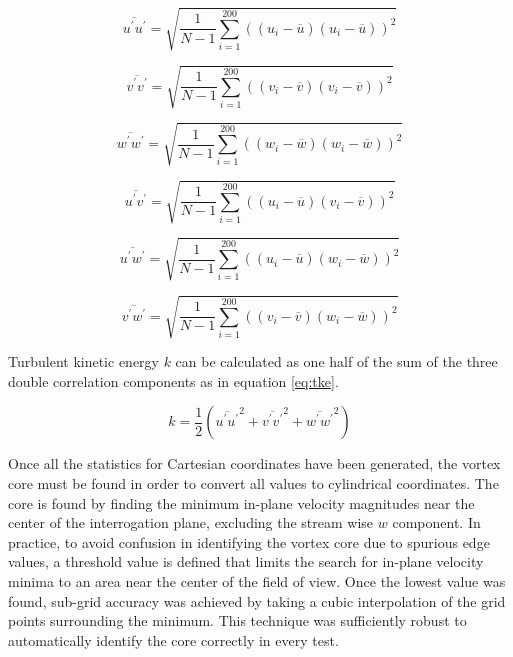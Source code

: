 \begin{equation}
\overline{u^\prime u^\prime} = \sqrt{\frac{1}{N-1} \sum_{i=1}^{200} 
	((u_i - \overline{u})(u_i - \overline{u}))^2}
\label{eq:rs_uu}
\end{equation}

\begin{equation}
\overline{v^\prime v^\prime} = \sqrt{\frac{1}{N-1} \sum_{i=1}^{200} 
	((v_i - \overline{v})(v_i - \overline{v}))^2}
\end{equation}

\begin{equation}
\overline{w^\prime w^\prime} = \sqrt{\frac{1}{N-1} \sum_{i=1}^{200} 
	((w_i - \overline{w})(w_i - \overline{w}))^2}
\end{equation}

\begin{equation}
\overline{u^\prime v^\prime} = \sqrt{\frac{1}{N-1} \sum_{i=1}^{200} 
	((u_i - \overline{u})(v_i - \overline{v}))^2}
\end{equation}

\begin{equation}
\overline{u^\prime w^\prime} = \sqrt{\frac{1}{N-1} \sum_{i=1}^{200} 
	((u_i - \overline{u})(w_i - \overline{w}))^2}
\end{equation}

\begin{equation}
\overline{v^\prime w^\prime} = \sqrt{\frac{1}{N-1} \sum_{i=1}^{200} 
	((v_i - \overline{v})(w_i - \overline{w}))^2}
\label{eq:rs_vw}
\end{equation}

Turbulent kinetic energy $k$ can be calculated as one half 
of the sum of the three double correlation components as in equation 
\ref{eq:tke}.

\begin{equation}
k = \frac{1}{2} \left(\overline{u^\prime u^\prime}^2 + 
	\overline{v^\prime v^\prime}^2 + 
	\overline{w^\prime w^\prime}^2\right)
\label{eq:tke}
\end{equation}


Once all the statistics for Cartesian coordinates have been generated, the 
vortex core must be found in order to convert all values to cylindrical 
coordinates. The core is found by finding the minimum in-plane velocity 
magnitudes near the center of the interrogation plane, excluding the stream 
wise $w$ component. In practice, to avoid confusion in identifying the vortex 
core due to spurious edge values, a threshold value is defined that limits the 
search for in-plane velocity minima to an area near the center of the field of 
view. Once the lowest value was found, sub-grid accuracy was 
achieved by taking a cubic interpolation of the grid points surrounding the 
minimum. This technique was sufficiently robust to automatically identify the 
core correctly in every test.

